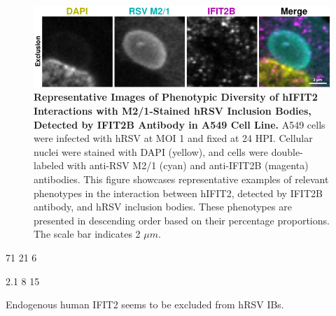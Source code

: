 \begin{figure}
    \centering
    \includegraphics[width=1\linewidth]{08. Chapter 3/Figs/02. Infection/02. IFIT2/02. IFIT2B/09. i2b a549 hrsv m21.pdf} 
    \caption[Representative Images of Phenotypic Diversity of hIFIT2 Interactions with M2/1-Stained hRSV Inclusion Bodies, Detected by IFIT2B Antibody in A549 Cell Line.]{\textbf{Representative Images of Phenotypic Diversity of hIFIT2 Interactions with M2/1-Stained hRSV Inclusion Bodies, Detected by IFIT2B Antibody in A549 Cell Line.} A549 cells were infected with hRSV at MOI 1 and fixed at 24 HPI. Cellular nuclei were stained with DAPI (yellow), and cells were double-labeled with anti-RSV M2/1 (cyan) and anti-IFIT2B (magenta) antibodies. This figure showcases representative examples of relevant phenotypes in the interaction between hIFIT2, detected by IFIT2B antibody, and hRSV inclusion bodies. These phenotypes are presented in descending order based on their percentage proportions. The scale bar indicates 2 \(\mu m\).}
    \label{fig:Representative Images of Phenotypic Diversity of hIFIT2 Interactions with M2/1-Stained hRSV Inclusion Bodies, Detected by IFIT2B Antibody in A549 Cell Line}
\end{figure}

71 21 6

2.1 8 15

Endogenous human IFIT2 seems to be excluded from hRSV IBs.

